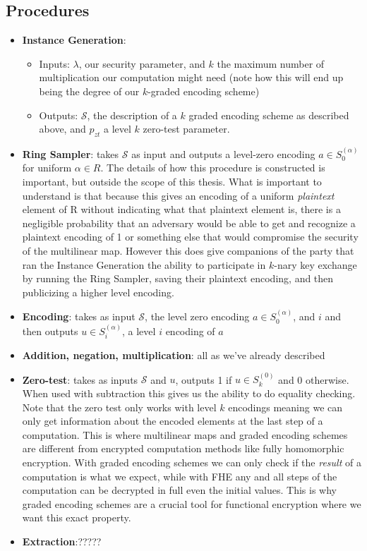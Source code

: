 \documentclass[12pt,twoside]{reedthesis}
\begin{document}
    
    
    \subsection{Procedures}
    \begin{itemize}
    \item \textbf{Instance Generation}: 
    	\begin{itemize}
    \item Inputs: $\lambda$, our security parameter, and $k$ the maximum number of multiplication our computation might need (note how this will end up being the degree of our $k$-graded encoding scheme)  
    \item Outputs: $\mathcal{S}$, the description of a $k$ graded encoding scheme as described above, and $p_{zt}$ a level $k$ zero-test parameter.
    	\end{itemize}  
	\item \textbf{Ring Sampler}: takes $\mathcal{S}$ as input and outputs a level-zero encoding $a \in S_0^{(\alpha)}$ for uniform $\alpha \in R$. The details of how this procedure is constructed is important, but outside the scope of this thesis. What is important to understand is that because this gives an encoding of a uniform \textit{plaintext} element of R without  indicating what that plaintext element is, there is a negligible probability that an adversary would be able to get and recognize a plaintext encoding of 1 or something else that would compromise the security of the multilinear map. However this does give companions of the party that ran the Instance Generation the ability to participate in $k$-nary key exchange by running the Ring Sampler, saving their plaintext encoding, and then publicizing a higher level encoding.
	\item \textbf{Encoding}: takes as input $\mathcal{S}$, the level zero encoding $a\in S_0^{(\alpha)}$, and $i$ and then outputs $u\in S_i^{(\alpha)}$, a level $i$ encoding of $a$
	\item \textbf{Addition, negation, multiplication}: all as we've already described
	\item \textbf{Zero-test}: takes as inputs $\mathcal{S}$ and $u$, outputs 1 if $u \in S_k^{(0)}$ and 0 otherwise. When used with subtraction this gives us the ability to do equality checking. Note that the zero test only works with level $k$ encodings meaning we can only get information about the encoded elements at the last step of a computation. This is where multilinear maps and graded encoding schemes are different from encrypted computation methods like fully homomorphic encryption. With graded encoding schemes we can only check if the \textit{result} of a computation is what we expect, while with FHE any and all steps of the computation can be decrypted in full even the initial values. This is why graded encoding schemes are a crucial tool for functional encryption where we want this exact property.
	\item \textbf{Extraction}:?????
    \end{itemize}
    
\end{document}

